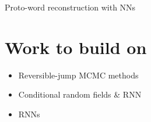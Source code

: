 \documentclass[a4paper, 10pt]{article}
\begin{document}
\begin{center}
    \Huge
    Proto-word reconstruction with NNs
\end{center}
\section{Work to build on}
\begin{itemize}
    \item Reversible-jump MCMC methods \cite{bouchard-Cote_et_al:2013} 
    \item Conditional random fields \& RNN \cite{ciobanu_ab_2018}
    \item RNNs \cite{meloni_ab_2019} 
\end{itemize}

\end{document}
